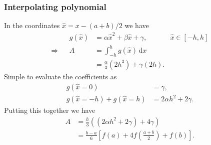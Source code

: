 \documentclass{beamer}
\begin{document}
\begin{frame}
  \frametitle{Interpolating polynomial}

  In the coordinates $\hat{x} = x - (a+b)/2$ we have
  \begin{align*}
    && g(\hat{x}) & = \alpha \hat{x}^2 + \beta \hat{x} + \gamma, &
    \hat{x} \in [-h, h] \\
    \Rightarrow && A & = \int_{-h}^h g(\hat{x}) \, \text{d}x \\
    &&& = \tfrac{\alpha}{3} \left( 2 h^3 \right) + \gamma \left( 2 h
    \right).
  \end{align*} \pause
%
  Simple to evaluate the coefficients as
  \begin{align*}
    g(\hat{x} = 0) & = \gamma, \\
    g(\hat{x} = -h) + g(\hat{x} = h) & = 2 \alpha h^2 + 2 \gamma.
  \end{align*} \pause
%
  Putting this together we have
  \begin{align*}
    A & = \tfrac{h}{3} \left( \left( 2 \alpha h^2 + 2 \gamma \right) +
      4 \gamma \right) \\
    & = \frac{b - a}{6} \left[ f(a) + 4 f \left( \frac{a + b}{2}
      \right) + f(b) \right].
  \end{align*}

\end{frame}
\end{document}
